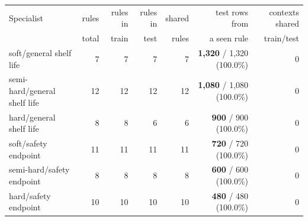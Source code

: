 \begin{tabular}{lrrrrrr}
\toprule
Specialist & rules & rules in & rules in & shared & test rows from & contexts shared \\
 & total & train & test & rules & a seen rule & train/test \\
\midrule
soft/general shelf life & 7 & 7 & 7 & 7 & \textbf{1,320} / 1,320 (100.0\%) & 0 \\
semi-hard/general shelf life & 12 & 12 & 12 & 12 & \textbf{1,080} / 1,080 (100.0\%) & 0 \\
hard/general shelf life & 8 & 8 & 6 & 6 & \textbf{900} / 900 (100.0\%) & 0 \\
soft/safety endpoint & 11 & 11 & 11 & 11 & \textbf{720} / 720 (100.0\%) & 0 \\
semi-hard/safety endpoint & 8 & 8 & 8 & 8 & \textbf{600} / 600 (100.0\%) & 0 \\
hard/safety endpoint & 10 & 10 & 10 & 10 & \textbf{480} / 480 (100.0\%) & 0 \\
\bottomrule
\end{tabular}